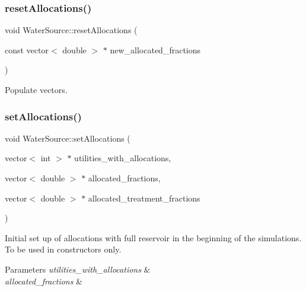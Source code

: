 \subsubsection{\texorpdfstring{reset\+Allocations()}{resetAllocations()}}
{\footnotesize\ttfamily void Water\+Source\+::reset\+Allocations (\begin{DoxyParamCaption}\item[{const vector$<$ double $>$ $\ast$}]{new\+\_\+allocated\+\_\+fractions }\end{DoxyParamCaption})}

Populate vectors. \mbox{\label{classWaterSource_ac834762e016e796968ad286feeca7be6_ac834762e016e796968ad286feeca7be6}} 
\subsubsection{\texorpdfstring{set\+Allocations()}{setAllocations()}}
{\footnotesize\ttfamily void Water\+Source\+::set\+Allocations (\begin{DoxyParamCaption}\item[{vector$<$ int $>$ $\ast$}]{utilities\+\_\+with\+\_\+allocations,  }\item[{vector$<$ double $>$ $\ast$}]{allocated\+\_\+fractions,  }\item[{vector$<$ double $>$ $\ast$}]{allocated\+\_\+treatment\+\_\+fractions }\end{DoxyParamCaption})}

Initial set up of allocations with full reservoir in the beginning of the simulations. To be used in constructors only. 
\begin{DoxyParams}{Parameters}
{\em utilities\+\_\+with\+\_\+allocations} & \\
\hline
{\em allocated\+\_\+fractions} & \\
\hline
\end{DoxyParams}
\mbox{\label{classWaterSource_ae29ed4aa2b9c97c5a41772daf4631f05_ae29ed4aa2b9c97c5a41772daf4631f05}} 
